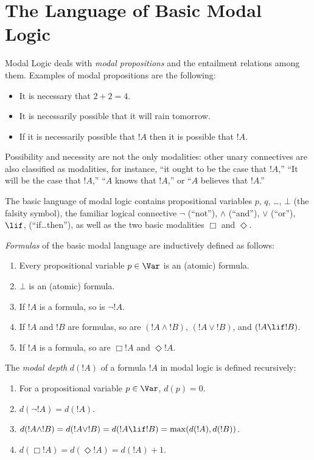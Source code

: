 \documentclass[modal-logic]{subfiles}
\begin{document}
\section{The Language of Basic Modal Logic}

Modal Logic deals with \emph{modal propositions} and the entailment
relations among them. Examples of modal propositions are the
following:
\begin{itemize}
\item It is necessary that $2+2=4$.
\item It is necessarily possible that it will rain tomorrow.
\item If it is necessarily possible that $!A$ then it is possible that $!A$.
\end{itemize}

Possibility and necessity are not the only modalities: other unary
connectives are also classified as modalities, for instance, ``it
ought to be the case that $!A$,'' ``It will be the case that
$!A$,'' ``$A$ knows that $!A$,'' or ``$A$ believes that $!A$.''


The basic language of modal logic contains propositional variables
$p$, $q$, \dots, $\bot$ (the falsity symbol), the familiar logical connective $\lnot$ (``not''),
$\land$ (``and''), $\lor$ (``or''), $\lif$, (``if\dots then''), as
well as the two basic modalities $\Box$ and $\Diamond$.  

\begin{defn}
\emph{Formulas} of the basic modal language are inductively defined as follows:
\begin{enumerate}
\item Every propositional variable $p \in \Var$ is an (atomic) formula.
\item $\bot$ is an (atomic) formula.
\item If $!A$ is a formula, so is $\lnot !A$.
\item If $!A$ and $!B$ are formulas, so are $(!A \land !B)$, $(!A \lor !B)$, and $(!A \lif !B)$.
\item If $!A$ is a formula, so are $\Box !A$ and $\Diamond !A$.
\end{enumerate}
\end{defn}


\begin{defn}
The \emph{modal depth} $d(!A)$ of a formula $!A$ in modal logic is defined recursively:
\begin{enumerate}
\item For a propositional variable $p \in \Var$, $d(p) = 0$.
\item $d(\lnot !A) = d(!A)$.
\item $d(!A \land !B) = d(!A \lor !B) = d(!A \lif !B) = \max( d(!A), d(!B))$.
\item $d(\Box !A) = d(\Diamond !A) = d(!A) + 1$.
\end{enumerate}
\end{defn}
\end{document}
